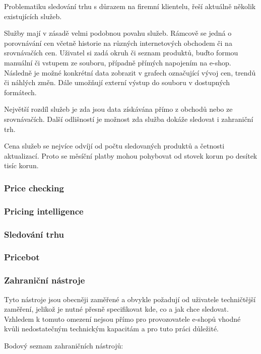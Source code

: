\documentclass[thesis=B,czech]{FITthesis}[2012/06/26]
\begin{document}
Problematiku sledování trhu s důrazem na firemní klientelu, řeší aktuálně několik existujících služeb.
\par
Služby mají v zásadě velmi podobnou povahu služeb. Rámcově se jedná o porovnávání cen včetně historie na různých internetových
obchodem či na srovnávačích cen. Uživatel si zadá okruh či seznam produktů, buďto formou manuální či vstupem ze souboru, případně 
přímých napojením na e-shop. Následně je možné konkrétní data zobrazit v grafech označující vývoj cen, trendů či náhlých změn.
Dále umožňují externí výstup do souboru v dostupných formátech.
\par
Největší rozdíl služeb je zda jsou data získávána přímo z obchodů nebo ze srovnávačích. Další odlišností je 
možnost zda služba dokáže sledovat i zahraniční trh.
\par
Cena služeb se nejvíce odvíjí od počtu sledovaných produktů a četnosti aktualizací. Proto se měsíční platby mohou 
pohybovat od stovek korun po desítek tisíc korun.

\subsubsection{Price checking}

\subsubsection{Pricing intelligence}

\subsubsection{Sledování trhu}

\subsubsection{Pricebot}

\newpage

\subsubsection{Zahraniční nástroje}
Tyto nástroje jsou obecněji zaměřené a obvykle požadují od uživatele techničtější zaměření, 
jelikož je nutné přesně specifikovat kde, co a jak chce sledovat. Vzhledem k tomuto omezení
nejsou přímo pro provozovatele e-shopů vhodné kvůli nedostatečným technickým kapacitám a 
pro tuto práci důležité.
\par
Bodový seznam zahraničních nástrojů:
\end{document}
